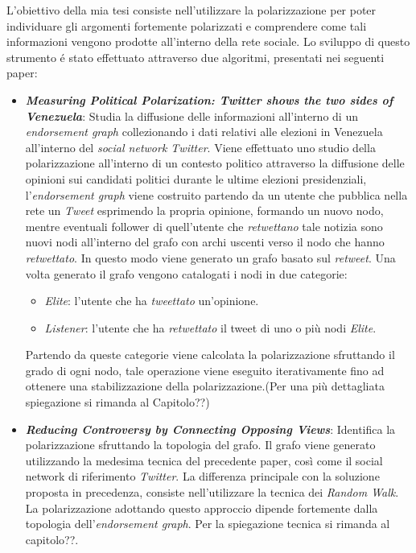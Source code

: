 L'obiettivo della mia tesi consiste nell'utilizzare la polarizzazione per poter individuare gli argomenti fortemente polarizzati e comprendere come tali informazioni vengono prodotte all'interno della rete sociale.
Lo sviluppo di questo strumento \'e stato effettuato attraverso due algoritmi, presentati nei seguenti paper:
\begin{itemize}
\item \textbf{\textit{Measuring Political Polarization: Twitter shows the two sides of Venezuela}}:
Studia la diffusione delle informazioni all'interno di un \textit{endorsement graph} collezionando i dati relativi alle elezioni in Venezuela all'interno del \textit{social network Twitter}. Viene effettuato uno studio della polarizzazione all'interno di un contesto politico attraverso la diffusione delle opinioni sui candidati politici durante le ultime elezioni presidenziali, l'\textit{endorsement graph} viene costruito partendo da un utente che pubblica nella rete un \textit{Tweet} esprimendo la propria opinione, formando un nuovo nodo, mentre eventuali follower di quell'utente che \textit{retwettano} tale notizia sono nuovi nodi all'interno del grafo con archi uscenti verso il nodo che hanno \textit{retwettato}. In questo modo viene generato un grafo basato sul \textit{retweet}.
Una volta generato il grafo vengono catalogati i nodi in due categorie:
\begin{itemize}
\item \textit{Elite}: l'utente che ha \textit{tweettato} un'opinione.
\item \textit{Listener}: l'utente che ha \textit{retwettato} il tweet di uno o più nodi \textit{Elite}.
\end{itemize}
Partendo da queste categorie viene calcolata la polarizzazione sfruttando il grado di ogni nodo, tale operazione viene eseguito iterativamente fino ad ottenere una stabilizzazione della polarizzazione.(Per una più dettagliata spiegazione si rimanda al Capitolo??)

\item \textbf{\textit{Reducing Controversy by Connecting Opposing Views}}:
Identifica la polarizzazione sfruttando la topologia del grafo. Il grafo viene generato utilizzando la medesima tecnica del precedente paper, così come il social network di riferimento \textit{Twitter}. %
La differenza principale con la soluzione proposta in precedenza, consiste nell'utilizzare la tecnica dei \textit{Random Walk}. La polarizzazione adottando questo approccio dipende fortemente dalla topologia dell'\textit{endorsement graph}. Per la spiegazione tecnica si rimanda al capitolo??.
\end{itemize}

